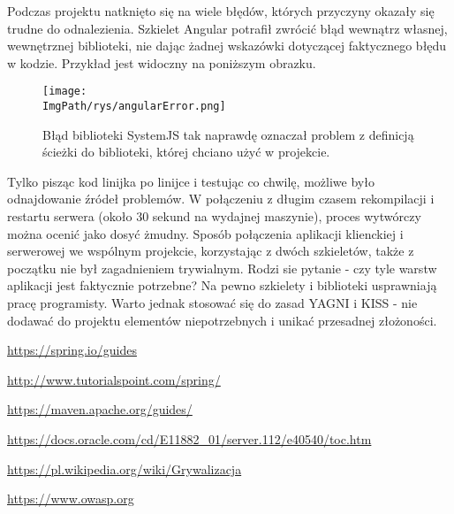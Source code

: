 \documentclass[a4paper,12pt,twoside,openany]{report}
\newcommand{\ImgPath}{.}
\begin{document}
Podczas projektu natknięto się na wiele błędów, których przyczyny okazały się trudne do odnalezienia. Szkielet Angular potrafił zwrócić błąd wewnątrz własnej, wewnętrznej biblioteki, nie dając żadnej wskazówki dotyczącej faktycznego błędu w kodzie. Przykład jest widoczny na poniższym obrazku.
				\begin{figure}[!htbp]
					\begin{center}
						\centering
						\texttt{[image: \\ImgPath/rys/angularError.png]}
					\end{center}
					\caption{Błąd biblioteki SystemJS tak naprawdę oznaczał problem z definicją ścieżki do biblioteki, której chciano użyć w projekcie.}
					\label{UMLTS}
				\end{figure}
Tylko pisząc kod linijka po linijce i testując co chwilę, możliwe było odnajdowanie źródeł problemów. W połączeniu z długim czasem rekompilacji i restartu serwera (około 30 sekund na wydajnej maszynie), proces wytwórczy można ocenić jako dosyć żmudny. Sposób połączenia aplikacji klienckiej i serwerowej we wspólnym projekcie, korzystając z dwóch szkieletów, także z początku nie był zagadnieniem trywialnym. Rodzi sie pytanie - czy tyle warstw aplikacji jest faktycznie potrzebne? Na pewno szkielety i biblioteki usprawniają pracę programisty. Warto jednak stosować się do zasad YAGNI i KISS - nie dodawać do projektu elementów niepotrzebnych i unikać przesadnej złożoności.


\begin{thebibliography}{99}

\newline \url{https://spring.io/guides}

\newline \url{http://www.tutorialspoint.com/spring/}

\newline \url{https://maven.apache.org/guides/}

\newline \url{https://docs.oracle.com/cd/E11882_01/server.112/e40540/toc.htm}


\newline \url{https://pl.wikipedia.org/wiki/Grywalizacja}

\newline \url{https://www.owasp.org}


\end{thebibliography}

\zakonczenie  %
\end{document}
